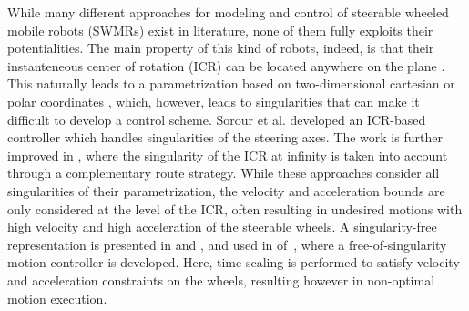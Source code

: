 While many different approaches for modeling and control of steerable wheeled
mobile robots (SWMRs) exist in literature, none of them fully exploits their
potentialities. The main property of this kind of robots, indeed, is that their
instanteneous center of rotation (ICR) can be located anywhere on the plane
\cite{Campion1996TR}. This naturally leads to a parametrization based on
two-dimensional cartesian \cite{Sorour2016ICRA} or polar coordinates
\cite{Connette2008CDC}, which, however, leads to singularities that can make
it difficult to develop a control scheme. Sorour et al. \cite{Sorour2017RAL}
developed an ICR-based controller which handles singularities of the steering
axes. The work is further improved in \cite{Sorour2019RAS}, where the
singularity of the ICR at infinity is taken into account through a
complementary route strategy. While these approaches consider all singularities
of their parametrization, the velocity and acceleration bounds are only
considered at the level of the ICR, often resulting in undesired motions with
high velocity and high acceleration of the steerable wheels.
A singularity-free representation is presented in \cite{Ferland2010IROS}
and \cite{Clavien2018EstimationoftheICR}, and used in
of~\cite{Clavien2018ICRMotionControl}, where a free-of-singularity motion
controller is developed. Here, time scaling is performed to satisfy velocity
and acceleration constraints on the wheels, resulting however in
non-optimal motion execution.
